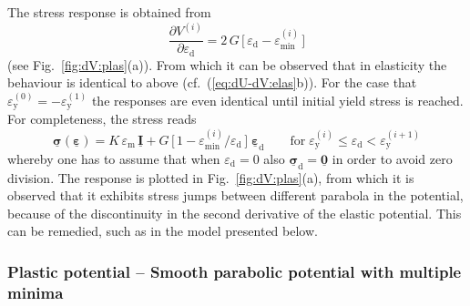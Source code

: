 \documentclass[times,namecite]{goose-article}
\newcommand\T[1]{\underline{\bm{{#1}}}}
\begin{document}
The stress response is obtained from
\begin{equation}\label{eq:dV-plas}
  \frac{\partial V^{(i)}}{\partial \varepsilon_\mathrm{d}}
  =
  2 \, G \, \Big[\, \varepsilon_\mathrm{d} - \varepsilon_\mathrm{min}^{(i)} \,\Big]
\end{equation}
(see Fig.~\ref{fig:dV:plas}(a)). From which it can be observed that in elasticity the behaviour is identical to above (cf.~(\ref{eq:dU-dV:elas}b)). For the case that $\varepsilon_\mathrm{y}^{(0)} = - \varepsilon_\mathrm{y}^{(1)}$ the responses are even identical until initial yield stress is reached. For completeness, the stress reads
\begin{equation}
  \T{\sigma} ( \T{\varepsilon} )
  =
  K \, \varepsilon_\mathrm{m} \, \T{I}
  +
  G \, \Big[\, 1 - \varepsilon_\mathrm{min}^{(i)} / \varepsilon_\mathrm{d} \,\Big] \;
  \T{\varepsilon}_\mathrm{d}
  \qquad
  \mathrm{for}
  \;
  \varepsilon_\mathrm{y}^{(i)} \leq \varepsilon_\mathrm{d} < \varepsilon_\mathrm{y}^{(i+1)}
\end{equation}
whereby one has to assume that when $\varepsilon_\mathrm{d} = 0$ also $\T{\sigma}_\mathrm{d} = \T{0}$ in order to avoid zero division. The response is plotted in Fig.~\ref{fig:dV:plas}(a), from which it is observed that it exhibits stress jumps between different parabola in the potential, because of the discontinuity in the second derivative of the elastic potential. This can be remedied, such as in the model presented below.

\subsubsection{Plastic potential -- Smooth parabolic potential with multiple minima}
\end{document}
